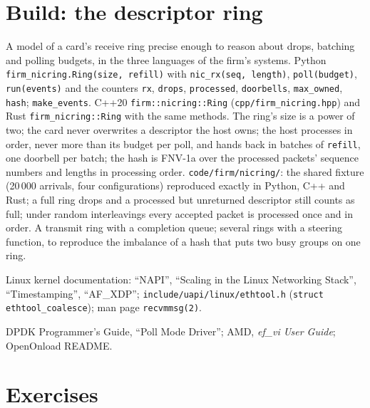 \section{Build: the descriptor ring}\label{bld:nw:network-cards-and-kernel-bypass:nicring}

\begin{build}
 A model of a card's receive ring precise enough to reason about drops, batching and polling budgets, in the three
languages of the firm's systems.
 Python \texttt{firm\_nicring.Ring(size, refill)} with \texttt{nic\_rx(seq, length)}, \texttt{poll(budget)},
\texttt{run(events)} and the counters \texttt{rx}, \texttt{drops}, \texttt{processed}, \texttt{doorbells}, \texttt{max\_owned},
\texttt{hash}; \texttt{make\_events}. C++20 \texttt{firm::nicring::Ring} (\texttt{cpp/firm\_nicring.hpp}) and Rust
\texttt{firm\_nicring::Ring} with the same methods.
 The ring's size is a power of two; the card never overwrites a descriptor the host owns; the host processes in order,
never more than its budget per poll, and hands back in batches of \texttt{refill}, one doorbell per batch; the hash is FNV-1a over
the processed packets' sequence numbers and lengths in processing order.
 \texttt{code/firm/nicring/}: the shared fixture (20\,000 arrivals, four configurations) reproduced exactly in
Python, C++ and Rust; a full ring drops and a processed but unreturned descriptor still counts as full; under random interleavings
every accepted packet is processed once and in order.
 A transmit ring with a completion queue; several rings with a steering function, to reproduce the imbalance of a hash
that puts two busy groups on one ring.
\end{build}

\begin{omsources}
\item Linux kernel documentation: ``NAPI'', ``Scaling in the Linux Networking Stack'', ``Timestamping'', ``AF\_XDP'';
\texttt{include/uapi/linux/ethtool.h} (\texttt{struct ethtool\_coalesce}); man page \texttt{recvmmsg(2)}.
\item DPDK Programmer's Guide, ``Poll Mode Driver''; AMD, \emph{ef\_vi User Guide}; OpenOnload README.
\end{omsources}

\section{Exercises}

